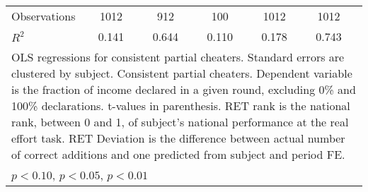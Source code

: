 {\begin{tabular}{l*{5}{cc}}
\hline
Observations    &     1012         &         &      912         &         &      100         &         &     1012         &         &     1012         &         \\
\(R^{2}\)       &    0.141         &         &    0.644         &         &    0.110         &         &    0.178         &         &    0.743         &         \\
\hline\hline
\multicolumn{11}{p{19cm}}{\tiny OLS regressions for consistent partial cheaters. Standard errors are clustered by subject. Consistent partial cheaters. Dependent variable is the fraction of income declared in a given round, excluding 0\% and 100\% declarations. t-values in parenthesis. RET rank is the national rank, between 0 and 1, of subject's national performance at the real effort task. RET Deviation is the difference between actual number of correct additions and one predicted from subject and period FE.}\\
\multicolumn{11}{l}{\footnotesize \sym{*} \(p<0.10\), \sym{**} \(p<0.05\), \sym{***} \(p<0.01\)}\\
\end{tabular}
}

